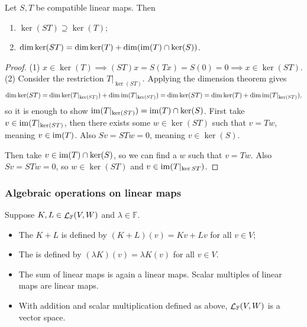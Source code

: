 \begin{proposition} \label{prop:kernelCompositionLinearMaps}
Let $S,T$ be compatible linear maps. Then
\begin{enumerate}
\item $\ker(ST)\supseteq \ker(T)$;
\item $\dim\ker(ST) = \dim\ker(T) + \dim(\operatorname{im}(T)\cap\ker(S))$.
\end{enumerate}
\end{proposition}
\begin{proof}
(1) $x\in\ker(T) \implies (ST)x = S(Tx) = S(0) = 0 \implies x\in\ker(ST)$.
(2) Consider the restriction $T|_{\ker(ST)}$. Applying the dimension theorem gives
\[ \dim\ker(ST) = \dim\ker(T|_{\ker(ST)}) + \dim\operatorname{im}(T|_{\ker(ST)}) = \dim\ker(ST) = \dim\ker(T) + \dim\operatorname{im}(T|_{\ker(ST)}) , \]
so it is enough to show $\operatorname{im}(T|_{\ker(ST)}) = \operatorname{im}(T)\cap\ker(S)$. First take $v\in\operatorname{im}(T|_{\ker(ST)}$, then there exists some $w\in\ker(ST)$ such that $v=Tw$, meaning $v\in\operatorname{im}(T)$. Also $Sv = STw = 0$, meaning $v\in\ker(S)$.

Then take $v\in\operatorname{im}(T)\cap\ker(S)$, so we can find a $w$ such that $v = Tw$. Also $Sv = STw = 0$, so $w\in\ker(ST)$ and $v\in\operatorname{im}(T|_{\ker{ST}})$.
\end{proof}

\subsubsection{Algebraic operations on linear maps}
\begin{definition}
Suppose $K,L \in \mathop{\mathcal{L}}_{\mathbb{F}}(V,W)$ and $\lambda \in \mathbb{F}$.
\begin{itemize}
\item The  $K+L$ is defined by $(K+L)(v) = Kv+Lv$ for all $v\in V$;
\item The  is defined by $(\lambda K)(v) = \lambda K(v)$ for all $v\in V$.
\end{itemize}
\end{definition}
\begin{proposition}
\begin{itemize}
\item The sum of linear maps is again a linear maps. Scalar multiples of linear maps are linear maps.
\item With addition and scalar multiplication defined as above, $\mathop{\mathcal{L}}_\mathbb{F}(V,W)$ is a vector space.
\end{itemize}
\end{proposition}

